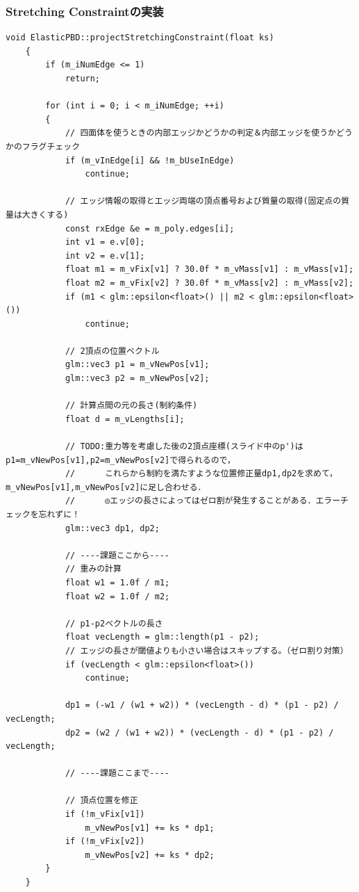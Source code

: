 \documentclass[a4paper,10pt,uplatex,dvipdfmx]{jsarticle}
\begin{document}
\subsubsection{Stretching Constraintの実装}
\begin{lstlisting}[caption=pbd.cppのprojectStretchingConstraint関数]
	void ElasticPBD::projectStretchingConstraint(float ks)
	{
		if (m_iNumEdge <= 1)
			return;
	
		for (int i = 0; i < m_iNumEdge; ++i)
		{
			// 四面体を使うときの内部エッジかどうかの判定＆内部エッジを使うかどうかのフラグチェック
			if (m_vInEdge[i] && !m_bUseInEdge)
				continue;
	
			// エッジ情報の取得とエッジ両端の頂点番号および質量の取得(固定点の質量は大きくする)
			const rxEdge &e = m_poly.edges[i];
			int v1 = e.v[0];
			int v2 = e.v[1];
			float m1 = m_vFix[v1] ? 30.0f * m_vMass[v1] : m_vMass[v1];
			float m2 = m_vFix[v2] ? 30.0f * m_vMass[v2] : m_vMass[v2];
			if (m1 < glm::epsilon<float>() || m2 < glm::epsilon<float>())
				continue;
	
			// 2頂点の位置ベクトル
			glm::vec3 p1 = m_vNewPos[v1];
			glm::vec3 p2 = m_vNewPos[v2];
	
			// 計算点間の元の長さ(制約条件)
			float d = m_vLengths[i];
	
			// TODO:重力等を考慮した後の2頂点座標(スライド中のp')はp1=m_vNewPos[v1],p2=m_vNewPos[v2]で得られるので，
			//      これらから制約を満たすような位置修正量dp1,dp2を求めて，m_vNewPos[v1],m_vNewPos[v2]に足し合わせる．
			//      ◎エッジの長さによってはゼロ割が発生することがある．エラーチェックを忘れずに！
			glm::vec3 dp1, dp2;
	
			// ----課題ここから----
			// 重みの計算
			float w1 = 1.0f / m1;
			float w2 = 1.0f / m2;
	
			// p1-p2ベクトルの長さ
			float vecLength = glm::length(p1 - p2);
			// エッジの長さが閾値よりも小さい場合はスキップする。（ゼロ割り対策）
			if (vecLength < glm::epsilon<float>())
				continue;
	
			dp1 = (-w1 / (w1 + w2)) * (vecLength - d) * (p1 - p2) / vecLength;
			dp2 = (w2 / (w1 + w2)) * (vecLength - d) * (p1 - p2) / vecLength;
	
			// ----課題ここまで----
	
			// 頂点位置を修正
			if (!m_vFix[v1])
				m_vNewPos[v1] += ks * dp1;
			if (!m_vFix[v2])
				m_vNewPos[v2] += ks * dp2;
		}
	}
\end{lstlisting}
\end{document}
